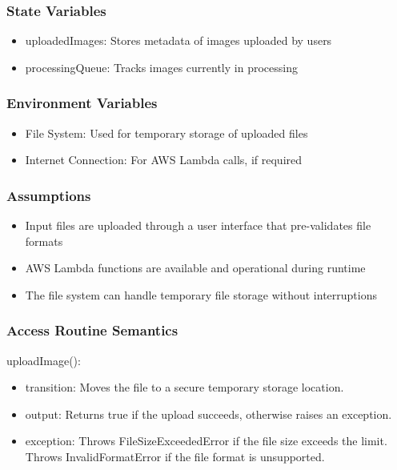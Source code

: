 \documentclass[12pt, titlepage]{article}
\begin{document}
\subsubsection{State Variables}

\begin{itemize}
  \item uploadedImages: Stores metadata of images uploaded by users
  \item processingQueue: Tracks images currently in processing
\end{itemize}

\subsubsection{Environment Variables}

\begin{itemize}
  \item File System: Used for temporary storage of uploaded files
  \item Internet Connection: For AWS Lambda calls, if required
\end{itemize}

\subsubsection{Assumptions}

\begin{itemize}
  \item Input files are uploaded through a user interface that pre-validates file formats
  \item AWS Lambda functions are available and operational during runtime
  \item The file system can handle temporary file storage without interruptions
\end{itemize}

\subsubsection{Access Routine Semantics}

\noindent uploadImage():
\begin{itemize}
\item transition: Moves the file to a secure temporary storage location.
\item output: Returns true if the upload succeeds, otherwise raises an exception.
\item exception: Throws FileSizeExceededError if the file size exceeds the limit. Throws InvalidFormatError if the file format is unsupported.
\end{itemize}
\end{document}
